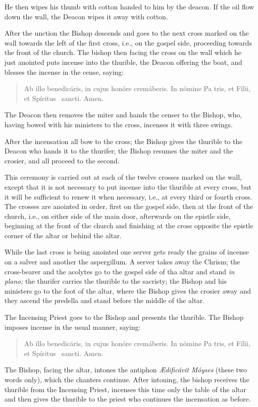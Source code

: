 \documentclass[letterpaper]{report}
\newcommand\blessincense{
\begin{quote}
   Ab illo benedicáris, in cujus honóre cremáberis. In nómine Pa\cross
    tris, et Fí\cross lii, et Spíritus \cross\ sancti. \rbar Amen.
\end{quote}
}
\begin{document}
{    He then wipes his thumb with cotton handed to him by the deacon. If the oil
    flow down the wall, the Deacon wipes it away with cotton.

    \rubric After the unction the Bishop descends and goes to the next cross
    marked on the wall towards the left of the first cross, i.e., on the
    gospel side, proceeding towards the front of the church. The bishop then
    facing the cross on the wall which he just anointed puts incense into the
    thurible, the Deacon offering the boat, and blesses the incense in the
    cense, saying: 

    \blessincense

    The Deacon then removes the miter and hands the censer to the Bishop, who,
    having bowed with his ministers to the cross, incenses it with three
    swings.

    After the incensation all bow to the cross; the Bishop gives the thurible
    to the Deacon who hands it to the thurifer; the Bishop resumes the miter
    and the crosier, and all proceed to the second. 
    
    \rubric This ceremony is carried out at each of the twelve crosses marked
    on the wall, except that it is not necessary to put incense into the
    thurible at every cross, but it will be sufficient to renew it when
    necessary, i.e., at every third or fourth cross. The crosses are anointed
    in order, first on the gospel side, then at the front of the church, i.e.,
    on either side of the main door, afterwards on the epistle side, beginning
    at the front of the church and finishing at the cross opposite the epistle
    corner of the altar or behind the altar.

    \rubric While the last cross is being anointed one server gets ready the
    grains of incense on a salver and another the aspergillum. A server takes
    away the Chrism; the cross-bearer and the acolytes go to the gospel side of
    tha altar and stand \textit{in plano;} the thurifer carries the thurible to
    the sacristy; the Bishop and his ministers go to the foot of the altar,
    where the Bishop gives the crosier away and they ascend the predella and
    stand before the middle of the altar.

    \rubric The Incensing Priest goes to the Bishop and presents the thurible.
    The Bishop imposes incense in the usual manner, saying:

    \blessincense

    The Bishop, facing the altar, intones the antiphon \textit{\AE dificávit
    Móyses} (these two words only), which the chanters continue. After
    intoning, the bishop receives the thurible from the Incensing Priest,
    incenses this time only the table of the altar and then gives the thurible
    to the priest who continues the incensation as before.

}
\end{document}

